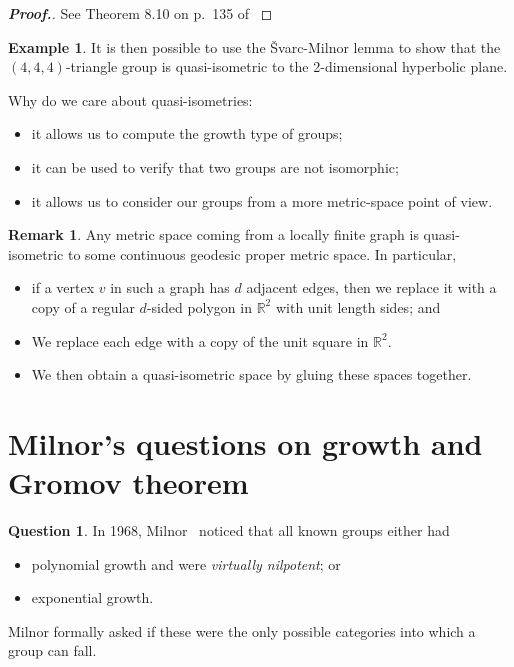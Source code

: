 \documentclass[11pt,a4paper,reqno]{amsart}
\theoremstyle{plain}
\theoremstyle{definition}
\theoremstyle{definition}
\newtheorem{example}[theorem]{Example}
\newtheorem{remark}[theorem]{Remark}
\newtheorem{question}[theorem]{Question}
\newenvironment{myproof}{\begin{proof}[\normalfont\bfseries Proof.]}{\end{proof}}
\begin{document}
\begin{myproof}
	See Theorem 8.10 on p.~135 of \cite{bridson2013metric}
\end{myproof}

\begin{example}
	It is then possible to use the Švarc-Milnor lemma to show that the $(4,4,4)$-triangle group is quasi-isometric to the 2-dimensional hyperbolic plane.
\end{example}

Why do we care about quasi-isometries:
\begin{itemize}
	\item it allows us to compute the growth type of groups;
	\item it can be used to verify that two groups are not isomorphic;
	\item it allows us to consider our groups from a more metric-space point of view.
\end{itemize}

\begin{remark}
	Any metric space coming from a locally finite graph is quasi-isometric to some continuous geodesic proper metric space.
	In particular,
	\begin{itemize}
		\item 
	if a vertex $v$ in such a graph has $d$ adjacent edges, then we replace it with a copy of a regular $d$-sided polygon in $\mathbb{R}^2$ with unit length sides; and
		\item 
	We replace each edge with a copy of the unit square in $\mathbb{R}^2$.
	\item We then obtain a quasi-isometric space by gluing these spaces together.
	\end{itemize}
\end{remark}

\section{Milnor's questions on growth and Gromov theorem}

\begin{question}
In 1968, Milnor~\cite{milnor1968a} noticed that all known groups either had
\begin{itemize}
	\item polynomial growth and were \emph{virtually nilpotent}; or
	\item exponential growth.
\end{itemize}
Milnor formally asked if these were the only possible categories into which a group can fall.
\end{question}
\end{document}

